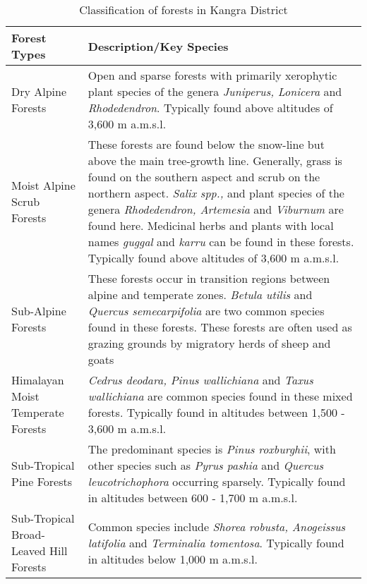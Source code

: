 \begin{table}[H]
	\small
	\def\arraystretch{1.7}
	\begin{threeparttable}
		\centering
		\caption{Classification of forests in Kangra District }
		\label{table5}
		\begin{tabular}{L{5.7cm} p{9.35cm}}
			\toprule[0.25mm]
			Forest Types & Description/Key Species \\
			\midrule[0.35mm]
			Dry Alpine Forests  & Open and sparse forests with primarily
			xerophytic plant species of the genera \textit{Juniperus, Lonicera} and \textit{Rhodedendron}. Typically found above altitudes of 3,600 m a.m.s.l.  \\
			Moist Alpine Scrub Forests  & These forests are found below the snow-line but above
			the main tree-growth line. Generally, grass is found on the southern aspect and scrub on the
			northern aspect. \textit{Salix spp.,} and plant species of the genera \textit{Rhodedendron, Artemesia} and \textit{Viburnum} are found here. Medicinal herbs and plants with local names \textit{guggal} and \textit{karru} can be found in
			these forests. Typically found above altitudes of 3,600 m a.m.s.l.  \\	
			Sub-Alpine Forests   & These forests occur in transition regions between alpine and temperate zones. \textit{Betula utilis} and \textit{Quercus semecarpifolia} are two common species found in these
			forests. These forests are often used as grazing grounds by migratory herds of sheep and goats \\
			Himalayan Moist Temperate Forests  & \textit{Cedrus deodara, Pinus wallichiana} and \textit{Taxus wallichiana} are common species found in these mixed forests. Typically found in altitudes between 1,500 - 3,600 m a.m.s.l. \\
			Sub-Tropical Pine Forests  & The predominant species is \textit{Pinus roxburghii}, with other species such as \textit{Pyrus pashia} and \textit{Quercus leucotrichophora} occurring sparsely. Typically found in altitudes between 600 - 1,700 m a.m.s.l.  \\
			Sub-Tropical Broad-Leaved Hill Forests  &Common species include \textit{Shorea robusta, Anogeissus latifolia} and \textit{Terminalia tomentosa}. Typically found in altitudes below 1,000 m a.m.s.l.  \\
			\bottomrule[0.25mm]
		\end{tabular}
	\end{threeparttable}
\end{table}


